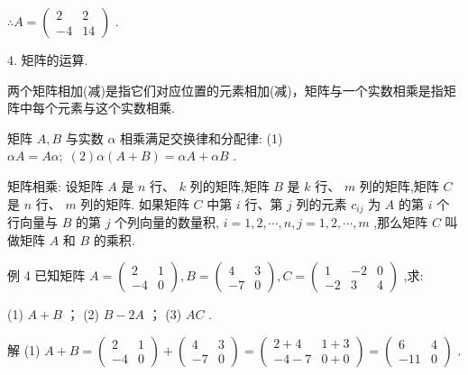 \documentclass[10pt]{article}
\begin{document}
\(\therefore A = \left( \begin{matrix} 2 & 2 \\   - 4 & {14} \end{matrix}\right)\) .

4. 矩阵的运算.

两个矩阵相加(减)是指它们对应位置的元素相加(减)，矩阵与一个实数相乘是指矩阵中每个元素与这个实数相乘.

矩阵 \(A,B\) 与实数 \(\alpha\) 相乘满足交换律和分配律: (1) \({\alpha A} = {A\alpha };\;\left( 2\right) \alpha \left( {A + B}\right)  = {\alpha A} + {\alpha B}\) .

矩阵相乘: 设矩阵 \(A\) 是 \(n\) 行、 \(k\) 列的矩阵,矩阵 \(B\) 是 \(k\) 行、 \(m\) 列的矩阵,矩阵 \(C\) 是 \(n\) 行、 \(m\) 列的矩阵. 如果矩阵 \(C\) 中第 \(i\) 行、第 \(j\) 列的元素 \({c}_{ij}\) 为 \(A\) 的第 \(i\) 个行向量与 \(B\) 的第 \(j\) 个列向量的数量积, \(i = 1,2,\cdots ,n,j = 1,2,\cdots ,m\) ,那么矩阵 \(C\) 叫做矩阵 \(A\) 和 \(B\) 的乘积.

例 4 已知矩阵 \(A = \left( \begin{matrix} 2 & 1 \\   - 4 & 0 \end{matrix}\right) ,B = \left( \begin{matrix} 4 & 3 \\   - 7 & 0 \end{matrix}\right) ,C = \left( \begin{matrix} 1 &  - 2 & 0 \\   - 2 & 3 & 4 \end{matrix}\right)\) ,求:

(1) \(A + B\) ； (2) \(B - {2A}\) ； (3) \({AC}\) .

解 (1) \(A + B = \left( \begin{matrix} 2 & 1 \\   - 4 & 0 \end{matrix}\right)  + \left( \begin{matrix} 4 & 3 \\   - 7 & 0 \end{matrix}\right)  = \left( \begin{matrix} 2 + 4 & 1 + 3 \\   - 4 - 7 & 0 + 0 \end{matrix}\right)  = \left( \begin{matrix} 6 & 4 \\   - {11} & 0 \end{matrix}\right)\) .
\end{document}
